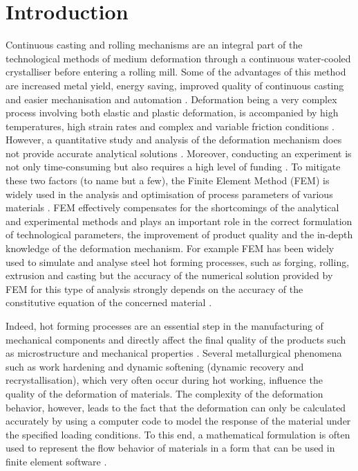\documentclass[twoside,english,1p,final,sort&compress]{elsarticle}
\theoremstyle{plain}
\begin{document}
\section{Introduction\label{sec:Introduction}}
Continuous casting and rolling mechanisms are an integral part of the technological methods of medium deformation through a continuous water-cooled crystalliser before entering a rolling mill. Some of the advantages of this method are increased metal yield, energy saving, improved quality of continuous casting and easier mechanisation and automation . Deformation being a very complex process involving both elastic and plastic deformation, is accompanied by high temperatures, high strain rates and complex and variable friction conditions \cite{He-2013}. However, a quantitative study and analysis of the deformation mechanism does not provide accurate analytical solutions . Moreover, conducting an experiment is not only time-consuming but also requires a high level of funding \cite{Changizian-2012}. To mitigate these two factors (to name but a few), the Finite Element Method (FEM) is widely used in the analysis and optimisation of process parameters of various materials . FEM effectively compensates for the shortcomings of the analytical and experimental methods and plays an important role in the correct formulation of technological parameters, the improvement of product quality and the in-depth knowledge of the deformation mechanism. For example FEM has been widely used to simulate and analyse steel hot forming processes, such as forging, rolling, extrusion and casting but the accuracy of the numerical solution provided by FEM for this type of analysis strongly depends  on the accuracy of the constitutive equation of the concerned material \cite{Qin-2010, Mandal-2009, Ji-2018}.

Indeed, hot forming processes are an essential step in the manufacturing of mechanical components and directly affect the ﬁnal quality of the products such as microstructure and mechanical properties \cite{Ashtiani-2012}. Several metallurgical phenomena such as work hardening and dynamic softening (dynamic recovery and recrystallisation), which very often occur during hot working, influence the quality of the deformation of materials. The complexity of the deformation behavior, however, leads to the fact that the deformation can only be calculated accurately by using a computer code to model the response of the material under the specified loading conditions. To this end, a mathematical formulation is often used to represent the flow behavior of materials in a form that can be used in finite element software \cite{Lin-2008-P,Wu-2012}.
\end{document}
